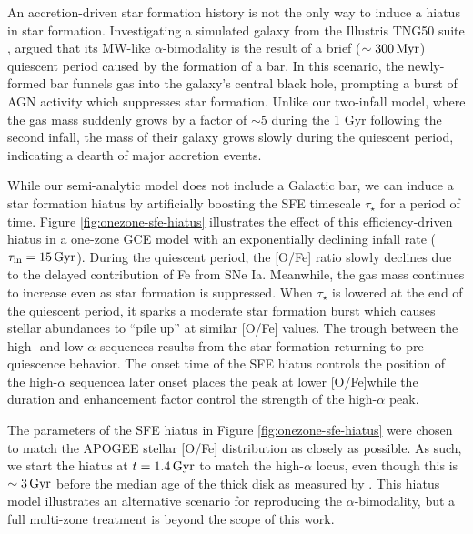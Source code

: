 \documentclass[twocolumn,twocolappendix,linenumbers]{aastex631}
\newcommand{\Gyr}{\,{\rm Gyr}}
\begin{document}
An accretion-driven star formation history is not the only way to induce a hiatus in star formation. Investigating a simulated galaxy from the Illustris TNG50 suite \citep{pillepich_first_2019,nelson_first_2019,nelson_illustristng_2019}, \citet{beane_rising_2024} argued that its MW-like $\alpha$-bimodality is the result of a brief ($\sim300\,{\rm Myr}$) quiescent period caused by the formation of a bar. In this scenario, the newly-formed bar funnels gas into the galaxy's central black hole, prompting a burst of AGN activity which suppresses star formation. Unlike our two-infall model, where the gas mass suddenly grows by a factor of $\sim5$ during the 1 Gyr following the second infall, the mass of their galaxy grows slowly during the quiescent period, indicating a dearth of major accretion events.

While our semi-analytic model does not include a Galactic bar, we can induce a star formation hiatus by artificially boosting the SFE timescale $\tau_\star$ for a period of time. Figure \ref{fig:onezone-sfe-hiatus} illustrates the effect of this efficiency-driven hiatus in a one-zone GCE model with an exponentially declining infall rate ($\tau_{\rm in}=15\Gyr$). During the quiescent period, the [O/Fe] ratio slowly declines due to the delayed contribution of Fe from SNe Ia. Meanwhile, the gas mass continues to increase even as star formation is suppressed. When $\tau_\star$ is lowered at the end of the quiescent period, it sparks a moderate star formation burst which causes stellar abundances to ``pile up'' at similar [O/Fe] values. The trough between the high- and low-$\alpha$ sequences results from the star formation returning to pre-quiescence behavior. The onset time of the SFE hiatus controls the position of the high-$\alpha$ sequence\textemdash a later onset places the peak at lower [O/Fe]\textemdash while the duration and enhancement factor control the strength of the high-$\alpha$ peak.

The parameters of the SFE hiatus in Figure \ref{fig:onezone-sfe-hiatus} were chosen to match the APOGEE stellar [O/Fe] distribution as closely as possible. As such, we start the hiatus at $t=1.4\Gyr$ to match the high-$\alpha$ locus, even though this is $\sim3\Gyr$ before the median age of the thick disk as measured by \citet{pinsonneault_apokasc-3_2025}. This hiatus model illustrates an alternative scenario for reproducing the $\alpha$-bimodality, but a full multi-zone treatment is beyond the scope of this work.
\end{document}
